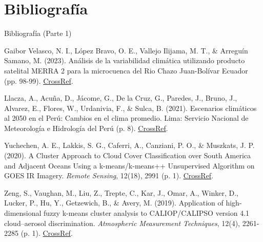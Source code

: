 \documentclass[aspectratio=169,xcolor=dvipsnames]{beamer}
\begin{document}
\section{Bibliografía}
\begin{frame}{Bibliografía (Parte 1)}
    \footnotesize{
        \begin{thebibliography}{99}
             Gaibor Velasco, N. I., López Bravo, O. E., Vallejo Ilijama, M. T., \& Arreguín Samano, M. (2023). Análisis de la variabilidad climática utilizando producto satelital MERRA 2 para la microcuenca del Rio Chazo Juan-Bolívar Ecuador (pp. 98-99). \href{https://doi.org/10.5281/zenodo.7930679}{CrossRef}.
            
             Llacza, A., Acuña, D., Jácome, G., De la Cruz, G., Paredes, J., Bruno, J., Alvarez, E., Flores, W., Urdanivia, F., \& Sulca, B. (2021). Escenarios climáticos al 2050 en el Perú: Cambios en el clima promedio. Lima: Servicio Nacional de Meteorología e Hidrología del Perú (p. 8). \href{https://hdl.handle.net/20.500.12542/1470}{CrossRef}.
            
             Yuchechen, A. E., Lakkis, S. G., Caferri, A., Canziani, P. O., \& Muszkats, J. P. (2020). A Cluster Approach to Cloud Cover Classification over South America and Adjacent Oceans Using a k-means/k-means++ Unsupervised Algorithm on GOES IR Imagery. \emph{Remote Sensing}, 12(18), 2991 (p. 1). \href{https://doi.org/10.3390/rs12182991}{CrossRef}.
            
             Zeng, S., Vaughan, M., Liu, Z., Trepte, C., Kar, J., Omar, A., Winker, D., Lucker, P., Hu, Y., Getzewich, B., \& Avery, M. (2019). Application of high-dimensional fuzzy k-means cluster analysis to CALIOP/CALIPSO version 4.1 cloud–aerosol discrimination. \emph{Atmospheric Measurement Techniques}, 12(4), 2261-2285 (p. 1). \href{https://doi.org/10.5194/amt-12-2261-2019}{CrossRef}.
        \end{thebibliography}
    }
\end{frame}
\end{document}
